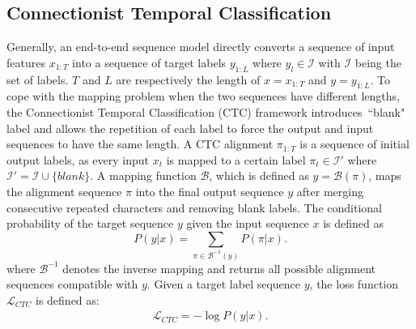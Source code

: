 \documentclass[journal]{IEEEtran}
\begin{document}
\subsection{Connectionist Temporal Classification}
\label{2.2}
Generally, an end-to-end sequence model directly converts a sequence of input features $x_{1:T}$ into a sequence of target labels $y_{1:L}$ where $y_{l} \in \mathcal{I}$ with $\mathcal{I}$ being the set of labels. $T$ and $L$ are respectively the length of $x=x_{1:T}$ and $y=y_{1:L}$. 
To cope with the mapping problem when the two sequences have different lengths, the Connectionist Temporal Classification (CTC) framework \cite{graves-et-al:scheme} introduces~``blank" label and allows the repetition of each label to force the output and input sequences to have the same length. A CTC alignment $\pi_{1:T}$ is a sequence of initial output labels, as every input $x_{t}$ is mapped to a certain label $\pi_{t} \in \mathcal{I'}$ where $\mathcal{I'} = \mathcal{I} \cup \{blank\}$. A mapping function $\mathcal{B}$, which is defined as $y = \mathcal{B}(\pi)$, maps the alignment sequence $\pi$ into the final output sequence $y$ after merging consecutive repeated characters and removing blank labels. 
The conditional probability of the target sequence $y$ given the input sequence $x$ is defined as
\begin{equation}
   P(y \vert x) = \sum_{\pi \in \mathcal{B}^{-1}(y)} P(\pi \vert x).
   \label{ctc}
\end{equation}
where $\mathcal{B}^{-1}$ denotes the inverse mapping and returns all possible alignment sequences compatible with $y$.
Given a target label sequence $y$, the loss function $\mathcal{L}_{CTC}$ is defined as:
%
\begin{align}
  \mathcal{L}_{CTC} = - \log P(y \vert x) .
\end{align}%

\end{document}
